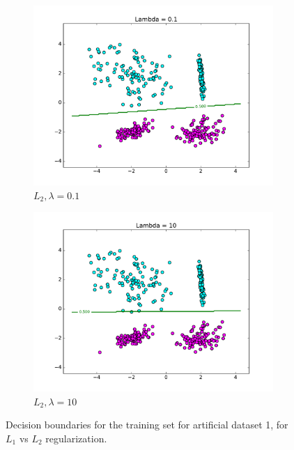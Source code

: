 \documentclass[10pt,psamsfonts]{amsart}
\theoremstyle{definition}
\theoremstyle{remark}
\numberwithin{equation}{section}
\begin{document}
\begin{figure}
\begin{subfigure}[b]{0.23\textwidth}
		\includegraphics[width=\textwidth]{hw2_1-2_8.pdf}
		\caption{$L_2, \lambda = 0.1$}
	\end{subfigure}
	\begin{subfigure}[b]{0.23\textwidth}
		\includegraphics[width=\textwidth]{hw2_1-2_10.pdf}
		\caption{$L_2, \lambda = 10$}
	\end{subfigure}
	\caption{Decision boundaries for the training set for artificial dataset 1, for $L_1$ vs $L_2$ regularization.}
\end{figure}
\end{document}
